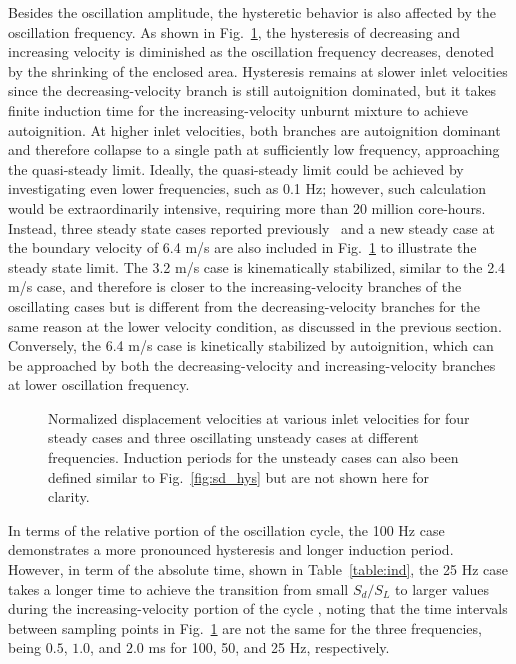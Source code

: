 \documentclass[review,3p,times]{elsarticle}
\begin{document}
\textcolor{Rev1}{Besides the oscillation amplitude, the hysteretic behavior is also affected by the oscillation frequency.}  As shown in Fig.~\ref{fig:sd_hys_frq}, the hysteresis of decreasing and increasing velocity is diminished as the oscillation frequency decreases, denoted by the shrinking of the enclosed area.  Hysteresis remains at slower inlet velocities since the decreasing-velocity branch is still autoignition dominated, but it takes finite induction time for the increasing-velocity unburnt mixture to achieve autoignition.  At higher inlet velocities, both branches are autoignition dominant and therefore collapse to a single path at sufficiently low frequency, approaching the quasi-steady limit.  \textcolor{Rev1}{Ideally, the quasi-steady limit could be achieved by investigating even lower frequencies, such as 0.1 Hz; however, such calculation would be extraordinarily intensive, requiring more than 20 million core-hours.  Instead, three steady state cases reported previously~\cite{deng15b} and a new steady case at the boundary velocity of 6.4 m/s are also included in Fig.~\ref{fig:sd_hys_frq} to illustrate the steady state limit.  The 3.2 m/s case is kinematically stabilized, similar to the 2.4 m/s case, and therefore is closer to the increasing-velocity branches of the oscillating cases but is different from the decreasing-velocity branches for the same reason at the lower velocity condition, as discussed in the previous section.  Conversely, the 6.4 m/s case is kinetically stabilized by autoignition, which can be approached by both the decreasing-velocity and increasing-velocity branches at lower oscillation frequency.}  

\begin{figure}[t]
  \centering
  \scriptsize
  \resizebox{0.5\textwidth}{!}{}
  \normalsize
  \vspace{-0.2in}
  \caption{\textcolor{Rev1}{Normalized displacement velocities at various inlet velocities for four steady cases and three oscillating unsteady cases at different frequencies.  Induction periods for the unsteady cases can also been defined similar to Fig.~\ref{fig:sd_hys} but are not shown here for clarity.}}
  \label{fig:sd_hys_frq}
\end{figure}

\textcolor{Rev1}{In terms of the relative portion of the oscillation cycle, the 100 Hz case demonstrates a more pronounced hysteresis and longer induction period.  However, in term of the absolute time, shown in Table~\ref{table:ind}, the 25 Hz case takes a longer time to achieve the transition from small $S_d/S_L$ to larger values during the increasing-velocity portion of the cycle , noting that the time intervals between sampling points in Fig.~\ref{fig:sd_hys_frq} are not the same for the three frequencies, being $0.5$, $1.0$, and $2.0$ ms for 100, 50, and 25 Hz, respectively.}
\end{document}
